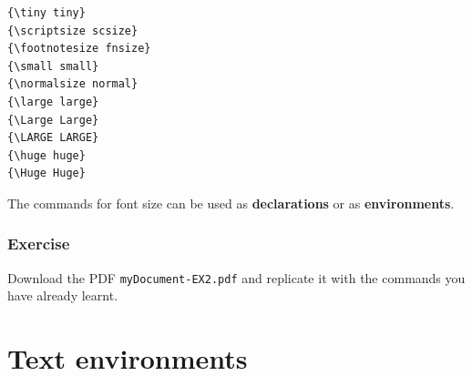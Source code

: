 \begin{frame}[fragile]


\begin{multicols}{2}
\begin{lstlisting}
{\tiny tiny} 
{\scriptsize scsize} 
{\footnotesize fnsize} 
{\small small} 
{\normalsize normal} 
{\large large} 
{\Large Large} 
{\LARGE LARGE} 
{\huge huge} 
{\Huge Huge} 
\end{lstlisting} 
\columnbreak{}
\end{multicols}

The commands for font size can be used as \textbf{declarations} or as \textbf{environments}.
\end{frame}


\begin{frame}[fragile]
\frametitle{Exercise}

Download the PDF \alert{\texttt{myDocument-EX2.pdf}} and replicate it with the commands you have already learnt.

\end{frame}


\section{Text environments}

